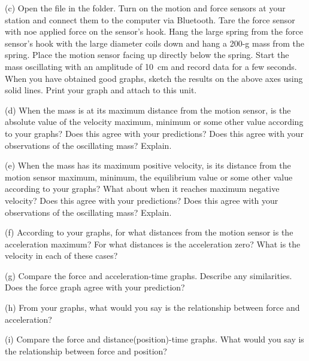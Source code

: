 
(c) Open the file  in the \filename{\coursefolder} folder. Turn on the motion and force sensors at your station and connect them to the computer via Bluetooth. Tare the force sensor with noe applied force on the sensor's hook. Hang the large spring from the force sensor's hook with the large diameter coils down and hang a 200-g mass from the spring.  Place the motion sensor facing up directly below the spring. Start the mass oscillating with an amplitude of 10~cm and record data for a few seconds. When you have obtained good graphs, sketch the results on the above axes using solid lines. Print your graph and attach to this unit.

(d) When the mass is at its maximum distance from the motion sensor, is the absolute value of the velocity maximum, minimum or some other value according to your graphs? Does this agree
with your predictions? Does this agree with your observations of the oscillating
mass? Explain.
\answerspace{15mm}

\pagebreak[2]
(e) When the mass has its maximum positive velocity, is its distance from the
motion sensor maximum, minimum, the equilibrium value or some other value according
to your graphs? What about when it reaches maximum negative velocity? Does this
agree with your predictions? Does this agree with your observations of the 
oscillating mass? Explain. 
\answerspace{10mm}

(f) According to your graphs, for what distances from the motion sensor is the 
acceleration maximum? For what distances is the acceleration zero? What is the 
velocity in each of these cases?
\answerspace{20mm}

(g) Compare the force and acceleration-time graphs. Describe any similarities.
Does the force graph agree with your prediction?
\answerspace{20mm}

(h) From your graphs, what would you say is the relationship between force and
acceleration? 
\answerspace{20mm}

(i) Compare the force and distance(position)-time graphs. What would you say
is the relationship between force and position? 
\answerspace{20mm}

